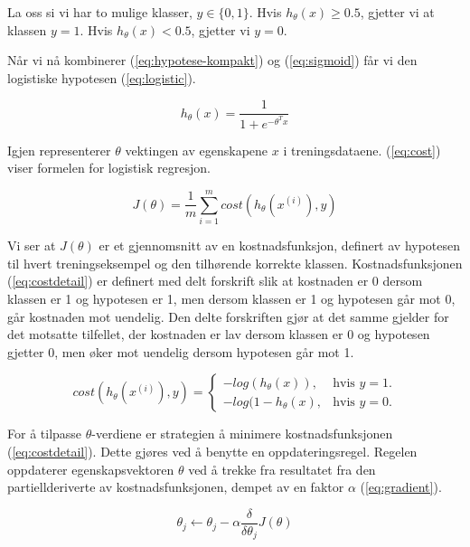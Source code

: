 La oss si vi har to mulige klasser, \(y \in \{0,1\}\). Hvis \( h_\theta(x) \geq  0.5\), gjetter vi at klassen \(y = 1\). Hvis \( h_\theta(x) < 0.5\), gjetter vi \(y = 0\).

Når vi nå kombinerer (\ref{eq:hypotese-kompakt}) og (\ref{eq:sigmoid}) får vi den logistiske hypotesen (\ref{eq:logistic}).

\begin{equation}
h_\theta(x) = \frac{1}{1 + e^{-\theta^{T}x}}
\label{eq:logistic}
\end{equation}

Igjen representerer $\theta$ vektingen av egenskapene $x$ i treningsdataene. (\ref{eq:cost}) viser formelen for logistisk regresjon.

\begin{equation}
J(\theta) = 
    \frac{1}{m} \sum_{i=1}^{m} cost(h_\theta(x^{(i)}), y)
\label{eq:cost}
\end{equation}

Vi ser at $J(\theta)$ er et gjennomsnitt av en kostnadsfunksjon, definert av hypotesen til hvert treningseksempel og den tilhørende korrekte klassen. Kostnadsfunksjonen (\ref{eq:costdetail}) er definert med delt forskrift slik at kostnaden er 0 dersom klassen er 1 og hypotesen er 1, men dersom klassen er 1 og hypotesen går mot 0, går kostnaden mot uendelig. Den delte forskriften gjør at det samme gjelder for det motsatte tilfellet, der kostnaden er lav dersom klassen er 0 og hypotesen gjetter 0, men øker mot uendelig dersom hypotesen går mot 1.

\begin{equation}
    cost(h_\theta(x^{(i)}), y) = \begin{cases}
    -log(h_\theta(x)), & \text{hvis $y=1$}.\\
    -log(1-h_\theta(x), & \text{hvis $y=0$}.
  \end{cases}
  \label{eq:costdetail}
\end{equation}

For å tilpasse $\theta$-verdiene er strategien å minimere kostnadsfunksjonen (\ref{eq:costdetail}). Dette gjøres ved å benytte en oppdateringsregel. Regelen oppdaterer egenskapsvektoren $\theta$ ved å trekke fra resultatet fra den partiellderiverte av kostnadsfunksjonen, dempet av en faktor $\alpha$ (\ref{eq:gradient}).

\begin{equation}
\theta_j \leftarrow \theta_j - \alpha \frac{\delta}{\delta\theta_j}J(\theta)
\label{eq:gradient}
\end{equation}

